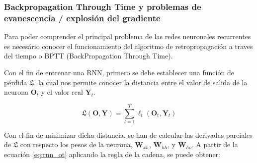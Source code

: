 \documentclass[a4paper,12pt]{article}
\begin{document}
\subsubsection{Backpropagation Through Time y problemas 
de evanescencia / explosión del gradiente}

Para poder comprender el principal problema de las redes 
neuronales recurrentes es necesário conocer el funcionamiento
del algoritmo de retropropagación a traves del tiempo o 
BPTT (BackPropagation Through Time).

Con el fin de entrenar una RNN, primero se debe establecer 
una función de pérdida $\mathfrak{L}$, la cual nos permite 
conocer la distancia entre el valor de salida de la neurona 
$\mathbf{O}_{t}$ y el valor real $\mathbf{Y}_{t}$.

\begin{equation}
    \mathfrak{L}(\mathbf{O}, \mathbf{Y}) = 
    \sum_{t=1}^{T}\ell_{t}(\mathbf{O}_{t}, \mathbf{Y}_{t})
    \label{eq:rnn_loss}
\end{equation}

Con el fin de minimizar dicha distancia, se han de calcular 
las derivadas parciales de $\mathfrak{L}$ con respecto 
los pesos de la neurona, $\mathbf{W}_{xh}$, $\mathbf{W}_{hh}$, 
y $\mathbf{W}_{ho}$. A partir de la ecuación \ref{eq:rnn_ot}
aplicando la regla de la cadena, se puede obtener:
\end{document}
